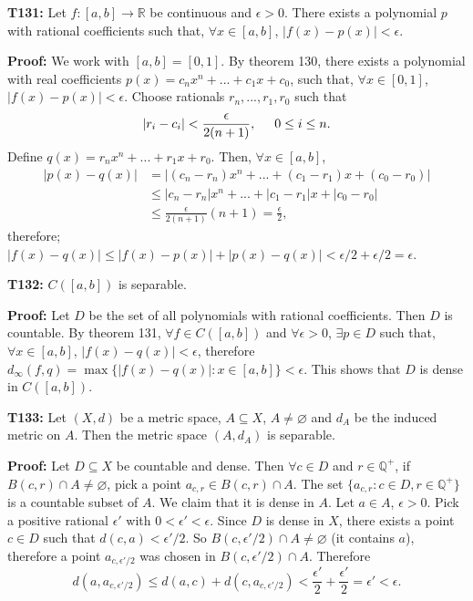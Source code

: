 \documentclass[twocolumn,10pt]{article}
\begin{document}
\textbf{T131:} Let $f:[a,b]\to\mathbb{R}$ be continuous and $\epsilon>0$. There exists a polynomial $p$ with rational coefficients such that, $\forall x\in[a,b]$, $|f(x)-p(x)|<\epsilon$.

\color{red}
\textbf{Proof:} We work with $[a,b]=[0,1]$. By theorem 130, there exists a polynomial with real coefficients $p(x)=c_nx^n+...+c_1x+c_0$, such that, $\forall x\in[0,1]$, $|f(x)-p(x)|<\epsilon$. Choose rationals $r_n,...,r_1,r_0$ such that
\begin{equation*}
    |r_i-c_i| < \frac{\epsilon}{2(n+1)}, \hspace{0.5cm} 0\leq i\leq n.
\end{equation*}
Define $q(x)=r_nx^n+...+r_1x+r_0$. Then, $\forall x\in[a,b]$,
\begin{align*}
    |p(x) - q(x)| &= |(c_n-r_n)x^n + ... + (c_1-r_1)x + (c_0-r_0)|\\
    &\leq |c_n-r_n|x^n + ... + |c_1-r_1|x + |c_0-r_0|\\
    &\leq \frac{\epsilon}{2(n+1)}(n+1) = \frac{\epsilon}{2},
\end{align*}
therefore; $|f(x)-q(x)|\leq|f(x)-p(x)|+|p(x)-q(x)|<\epsilon/2+\epsilon/2=\epsilon$.
\color{black}

\textbf{T132:} $C([a,b])$ is separable.

\color{red}
\textbf{Proof:} Let $D$ be the set of all polynomials with rational coefficients. Then $D$ is countable. By theorem 131, $\forall f\in C([a,b])$ and $\forall\epsilon>0$, $\exists p\in D$ such that, $\forall x\in[a,b]$, $|f(x)-q(x)|<\epsilon$, therefore $d_{\infty}(f,q)=\max\{|f(x)-q(x)| : x\in[a,b]\}<\epsilon$. This shows that $D$ is dense in $C([a,b])$.
\color{black}

\textbf{T133:} Let $(X,d)$ be a metric space, $A\subseteq X$, $A\neq\varnothing$ and $d_A$ be the induced metric on $A$. Then the metric space $(A,d_A)$ is separable.

\color{red}
\textbf{Proof:} Let $D\subseteq X$ be countable and dense. Then $\forall c\in D$ and $r\in\mathbb{Q}^+$, if $B(c,r)\cap A\neq\varnothing$, pick a point $a_{c,r}\in B(c,r)\cap A$. The set $\{a_{c,r}:c\in D, r\in\mathbb{Q}^+\}$ is a countable subset of $A$. We claim that it is dense in $A$. Let $a\in A$, $\epsilon>0$. Pick a positive rational $\epsilon'$ with $0<\epsilon'<\epsilon$. Since $D$ is dense in $X$, there exists a point $c\in D$ such that $d(c,a)<\epsilon'/2$. So $B(c,\epsilon'/2)\cap A\neq\varnothing$ (it contains $a$), therefore a point $a_{c,\epsilon'/2}$ was chosen in $B(c,\epsilon'/2)\cap A$. Therefore
\begin{equation*}
    d(a,a_{c,\epsilon'/2}) \leq d(a,c) + d(c,a_{c,\epsilon'/2}) < \frac{\epsilon'}{2} + \frac{\epsilon'}{2} = \epsilon' < \epsilon.
\end{equation*}
\color{black}
\end{document}
